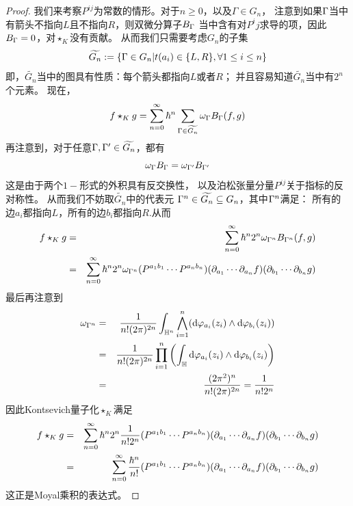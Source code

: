 \begin{proof}
我们来考察$P^{ij}$为常数的情形。对于$n\geq 0$，以及$\Gamma\in G_n$，
注意到如果$\Gamma$当中有箭头不指向$L$且不指向$R$，则双微分算子$B_\Gamma$
当中含有对$P^ij$求导的项，因此$B_\Gamma=0$，对$\star_K$没有贡献。
从而我们只需要考虑$G_n$的子集
$$\widetilde{G_n}:=\{\Gamma\in G_n|t(a_i)\in\{L,R\},\forall 1\leq i\leq n\}$$
即，$\widetilde{G_n}$当中的图具有性质：每个箭头都指向$L$或者$R$；
并且容易知道$\widetilde{G_n}$当中有$2^n$个元素。
现在，
$$
  f\star_K g=
  \sum_{n=0}^{\infty}
    \hbar^n
    \sum_{\Gamma\in\widetilde{G_n}}
      \omega_{\Gamma}B_{\Gamma}(f,g)
$$
再注意到，对于任意$\Gamma,\Gamma'\in\widetilde{G_n}$，都有
$$\omega_{\Gamma}B_{\Gamma}=\omega_{\Gamma'}B_{\Gamma'}$$
这是由于两个$1-$形式的外积具有反交换性，
以及泊松张量分量$P^{ij}$关于指标的反对称性。
从而我们不妨取$\widetilde{G_n}$中的代表元
$\Gamma^n\in\widetilde{G_n}\subseteq G_n$，其中$\Gamma^n$满足：
所有的边$a_i$都指向$L$，所有的边$b_i$都指向$R$.从而
\begin{eqnarray*}
  f\star_K g
&=&
  \sum_{n=0}^{\infty}
    \hbar^n
      2^n\omega_{\Gamma^n}B_{\Gamma^n}(f,g)\\
&=&
  \sum_{n=0}^{\infty}
    \hbar^n2^n
      \omega_{\Gamma^n}
      (P^{a_1b_1}\cdots P^{a_nb_n})
      (\partial_{a_1}\cdots\partial_{a_n}f)
      (\partial_{b_1}\cdots\partial_{b_n}g)
\end{eqnarray*}
最后再注意到
\begin{eqnarray*}
     \omega_{\Gamma^n}
&=&
     \frac{1}{n!(2\pi)^{2n}}
     \int_{\mathbb{H}^n}
       \bigwedge_{i=1}^n
         (
         \mathrm{d}\varphi_{a_i}(z_i)\wedge
         \mathrm{d}\varphi_{b_i}(z_i)
         )\\
&=&
     \frac{1}{n!(2\pi)^{2n}}
     \prod_{i=1}^n
       \left(
         \int_{\mathbb{H}}
           \mathrm{d}\varphi_{a_i}(z_i)\wedge
           \mathrm{d}\varphi_{b_i}(z_i)
       \right)\\
&=&
     \frac{(2\pi^2)^n}{n!(2\pi)^{2n}}
 =
     \frac{1}{n!2^n}
\end{eqnarray*}
因此Kontsevich量子化$\star_K$满足
\begin{eqnarray*}
  f\star_K g
&=&
  \sum_{n=0}^{\infty}
    \hbar^n2^n
      \frac{1}{n!2^n}
      (P^{a_1b_1}\cdots P^{a_nb_n})
      (\partial_{a_1}\cdots\partial_{a_n}f)
      (\partial_{b_1}\cdots\partial_{b_n}g)\\
&=&
     \sum_{n=0}^{\infty}
      \frac{\hbar^n}{n!}
      (P^{a_1b_1}\cdots P^{a_nb_n})
      (\partial_{a_1}\cdots\partial_{a_n}f)
      (\partial_{b_1}\cdots\partial_{b_n}g)\\
\end{eqnarray*}
这正是Moyal乘积的表达式。
\end{proof}










